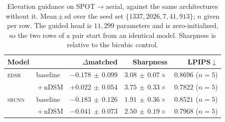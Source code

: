 \begin{table}[t]\centering\footnotesize
\caption{Elevation guidance on SPOT$\rightarrow$aerial, against the same architectures without it. Mean\,$\pm$\,sd over the seed set $\{1337, 2026, 7, 41, 913\}$; $n$ given per row. The guided head is $11{,}299$ parameters and is zero-initialised, so the two rows of a pair start from an identical model. Sharpness is relative to the bicubic control.}
\label{tab:guided}
\setlength{\tabcolsep}{4pt}
\begin{tabular}{@{}llrrr@{}}\toprule
Model & & $\Delta$matched & Sharpness & LPIPS$\downarrow$\\\midrule
\textsc{edsr} & baseline & $-0.178\,{\pm}\,0.099$ & $3.08\,{\pm}\,0.07\times$ & $0.8696$ \scriptsize($n{=}5$)\\
 & \,+\,nDSM & $+0.022\,{\pm}\,0.054$ & $3.75\,{\pm}\,0.33\times$ & $0.7822$ \scriptsize($n{=}5$)\\
\midrule
\textsc{srcnn} & baseline & $-0.183\,{\pm}\,0.126$ & $1.91\,{\pm}\,0.36\times$ & $0.8521$ \scriptsize($n{=}5$)\\
 & \,+\,nDSM & $-0.041\,{\pm}\,0.073$ & $2.50\,{\pm}\,0.19\times$ & $0.7968$ \scriptsize($n{=}5$)\\
\bottomrule\end{tabular}\end{table}